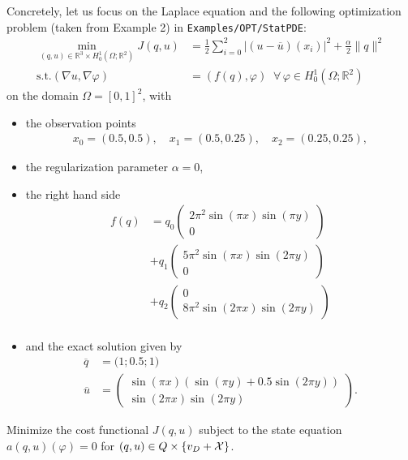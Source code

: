 \documentclass[prodmode,acmtoms]{acmsmall}
\numberwithin{equation}{section}
\renewcommand{\phi}{\varphi}
\begin{document}
Concretely, let us focus on the Laplace equation and 
the following optimization problem (taken from 
Example 2) in \texttt{Examples/OPT/StatPDE}:
\begin{align*}
\min_{(q,u)\in \mathbb R^3 \times H_0^1(\Omega; \mathbb R^2)} J(q,u) &=
\frac{1}{2} \sum_{i=0}^2 |(u-\overline u)(x_i)|^2 + \frac{\alpha}{2}\|q\|^2\\
\text{s.t.} (\nabla u,\nabla \phi) &= (f(q),\phi)\;\;\forall\,\phi \in H^1_0(\Omega; \mathbb R^2)
\end{align*}
on the domain $\Omega = [0,1]^2$, with
\begin{itemize}
\item the observation points
\begin{align*}
x_0 = (0.5, 0.5), \quad x_1 = (0.5, 0.25),\quad x_2 = (0.25, 0.25),
\end{align*}
\item the regularization parameter $\alpha = 0$, 
\item the right hand side
\begin{align*}
 f(q) &= q_0 \left(\begin{matrix}2\pi^2  \sin( \pi x) \sin(\pi y)\\0 \end{matrix}\right)\\
      &+ q_1 \left(\begin{matrix}5\pi^2  \sin( \pi x) \sin(2\pi y)\\0 \end{matrix}\right)\\
      &+ q_2 \left(\begin{matrix}0 \\8\pi^2  \sin(2\pi x) \sin(2\pi y)\end{matrix}\right)\\
\end{align*}
\item and the exact solution given by 
\begin{align*}
 \overline{q} &= \bigl(1;0.5;1\bigr)\\
 \overline{u}& = \left(\begin{matrix} \sin( \pi x)( \sin(\pi y)+0.5\sin(2\pi y))\\\sin(2\pi x) \sin(2\pi y) \end{matrix}\right).
\end{align*}
\end{itemize}
\begin{defi}
\label{problem_constraint_optimization}
Minimize the cost functional $J(q,u)$ subject to the state equation
$a(q,u)(\phi) = 0$ for $(q,u) \in 
Q\times  \{v_D+{\cal X}\}$. 
\end{defi}
\end{document}
